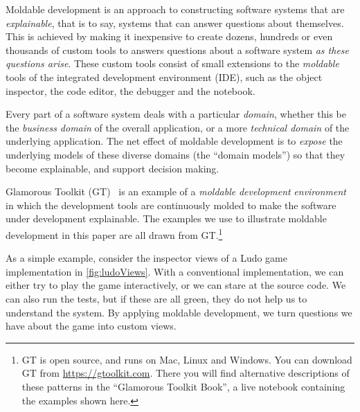\documentclass[sigconf,screen]{acmart}
\newcommand\cp[1]{\nbe{Cesare}{#1}{olive}} %
\newcommand\ws[1]{\nbe{Workshop}{#1}{teal}} %
\begin{document}
Moldable development is an approach to constructing software systems that are \emph{explainable}, that is to say, systems that can answer questions about themselves.
This is achieved by making it inexpensive to create dozens, hundreds or even thousands of custom tools to answers questions about a software system \emph{as these questions arise}.
These custom tools consist of small extensions to the \emph{moldable} tools of the integrated development environment (IDE), such as the object inspector, the code editor, the debugger and the notebook.

Every part of a software system deals with a particular \emph{domain}, whether this be the \emph{business domain} of the overall application, or a more \emph{technical domain}  of the underlying application.
The net effect of moldable development is to \emph{expose} the underlying models of these diverse domains (\ie the ``domain models'') 
so that they become explainable, and support decision making.

Glamorous Toolkit (GT)~\cite{feenk23a} is an example of a \emph{moldable} \emph{development} \emph{environment} in which the development tools are continuously molded to make the software under development explainable.
The examples we use to illustrate moldable development in this paper are all drawn from GT.\footnote{GT is open source, and runs on Mac, Linux and Windows. You can download GT from \url{https://gtoolkit.com}.
There you will find alternative descriptions of these patterns in the ``Glamorous Toolkit Book'', a live notebook containing the examples shown here.}

As a simple example, consider the inspector views of a Ludo game implementation in \autoref{fig:ludoViews}.
With a conventional implementation, we can either try to play the game interactively, or we can stare at the source code.
We can also run the tests, but if these are all green, they do not help us to understand the system.
By applying moldable development, we turn questions we have about the game into custom views.
\end{document}
